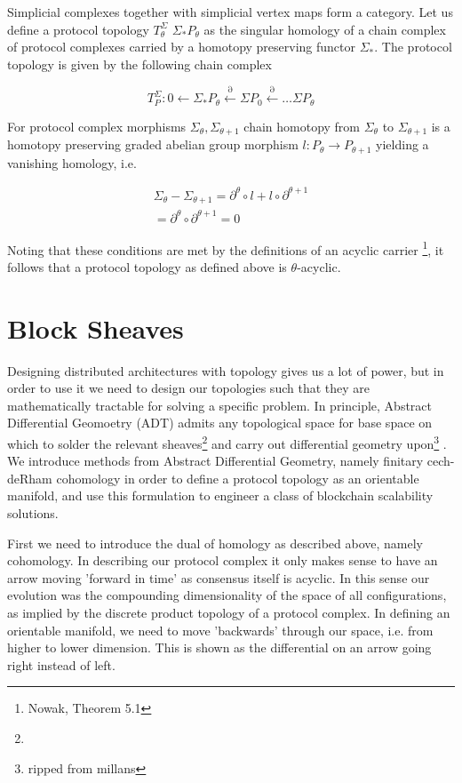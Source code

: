 \documentclass{article}
\begin{document}
Simplicial complexes together with simplicial vertex maps form a category. Let us define a protocol topology $T^{\Sigma}_\theta$ $\Sigma_{*}P_\theta$ as the singular homology of a chain complex of protocol complexes carried by a homotopy preserving functor $\Sigma_*$. The protocol topology is given by the following chain complex

\begin{equation} \label{eq1}
T^{\Sigma}_P: 0 \leftarrow \Sigma_{*}P_\theta \xleftarrow{\partial} \Sigma P_{0} \xleftarrow{\partial} \dots \Sigma P_\theta
\end{equation} \label{eq1}

For protocol complex morphisms $\Sigma_\theta, \Sigma_{\theta+1}$ chain homotopy from $\Sigma_\theta$ to $\Sigma_{\theta+1}$ is a homotopy preserving graded abelian group morphism $l: P_{\theta} \rightarrow P_{\theta+1}$ yielding a vanishing homology, i.e. 

\begin{equation} \label{eq1}
\begin{split}
\Sigma_\theta - \Sigma_{\theta+1} =  \partial^{\theta}\circ l + l \circ \partial^{\theta+1} \\
= \partial^\theta \circ \partial^{\theta+1} = 0
\end{split}
\end{equation}

Noting that these conditions are met by the definitions of an acyclic carrier \footnote{Nowak, Theorem 5.1}, it follows that a protocol topology as defined above is $\theta$-acyclic.

\section{Block Sheaves}
Designing distributed architectures with topology gives us a lot of power, but in order to use it we need to design our topologies such that they are mathematically tractable for solving a specific problem. In principle, Abstract Differential Geomoetry (ADT) admits any topological space for base space on which to solder the relevant sheaves\footnote{} and carry out differential geometry upon\footnote{ripped from millans} . We introduce methods from Abstract Differential Geometry, namely finitary cech-deRham cohomology in order to define a protocol topology as an orientable manifold, and use this formulation to engineer a class of blockchain scalability solutions.

First we need to introduce the dual of homology as described above, namely cohomology. In describing our protocol complex it only makes sense to have an arrow moving 'forward in time' as consensus itself is acyclic. In this sense our evolution was the compounding dimensionality of the space of all configurations, as implied by the discrete product topology of a protocol complex. In defining an orientable manifold, we need to move 'backwards' through our  space, i.e. from higher to lower dimension. This is shown as the differential on an arrow going right instead of left.
\end{document}
